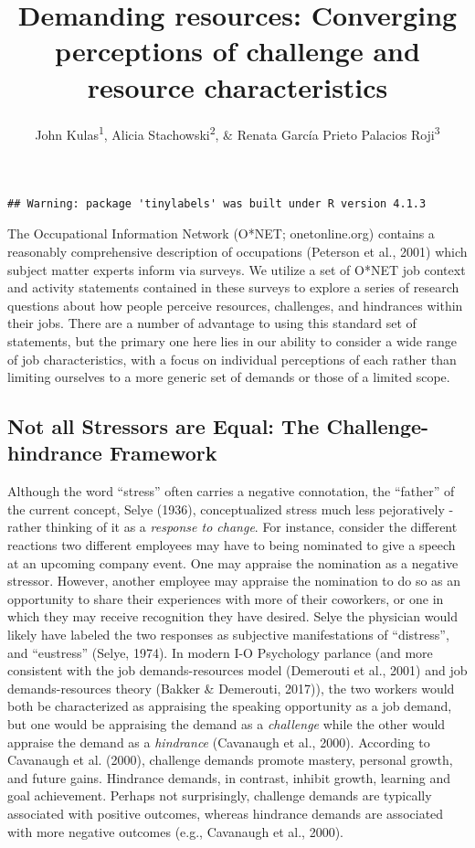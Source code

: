 \documentclass[
  man]{apa6}
\title{Demanding resources: Converging perceptions of challenge and resource characteristics}
\author{John Kulas\textsuperscript{1}, Alicia Stachowski\textsuperscript{2}, \& Renata García Prieto Palacios Roji\textsuperscript{3}}
\date{}
\affiliation{\vspace{0.5cm}\textsuperscript{1} eRg\\\textsuperscript{2} University of Wisconsin - Stout\\\textsuperscript{3} PepsiCo}
\begin{document}
\maketitle

\begin{verbatim}
## Warning: package 'tinylabels' was built under R version 4.1.3
\end{verbatim}

The Occupational Information Network (O*NET; onetonline.org) contains a reasonably comprehensive description of occupations (Peterson et al., 2001) which subject matter experts inform via surveys. We utilize a set of O*NET job context and activity statements contained in these surveys to explore a series of research questions about how people perceive resources, challenges, and hindrances within their jobs. There are a number of advantage to using this standard set of statements, but the primary one here lies in our ability to consider a wide range of job characteristics, with a focus on individual perceptions of each rather than limiting ourselves to a more generic set of demands or those of a limited scope.

\hypertarget{not-all-stressors-are-equal-the-challenge-hindrance-framework}{%
\subsection{Not all Stressors are Equal: The Challenge-hindrance Framework}\label{not-all-stressors-are-equal-the-challenge-hindrance-framework}}

Although the word ``stress'' often carries a negative connotation, the ``father'' of the current concept, Selye (1936), conceptualized stress much less pejoratively - rather thinking of it as a \emph{response to change}. For instance, consider the different reactions two different employees may have to being nominated to give a speech at an upcoming company event. One may appraise the nomination as a negative stressor. However, another employee may appraise the nomination to do so as an opportunity to share their experiences with more of their coworkers, or one in which they may receive recognition they have desired. Selye the physician would likely have labeled the two responses as subjective manifestations of ``distress'', and ``eustress'' (Selye, 1974). In modern I-O Psychology parlance (and more consistent with the job demands-resources model (Demerouti et al., 2001) and job demands-resources theory (Bakker \& Demerouti, 2017)), the two workers would both be characterized as appraising the speaking opportunity as a job demand, but one would be appraising the demand as a \emph{challenge} while the other would appraise the demand as a \emph{hindrance} (Cavanaugh et al., 2000). According to Cavanaugh et al. (2000), challenge demands promote mastery, personal growth, and future gains. Hindrance demands, in contrast, inhibit growth, learning and goal achievement. Perhaps not surprisingly, challenge demands are typically associated with positive outcomes, whereas hindrance demands are associated with more negative outcomes (e.g., Cavanaugh et al., 2000).
\end{document}
